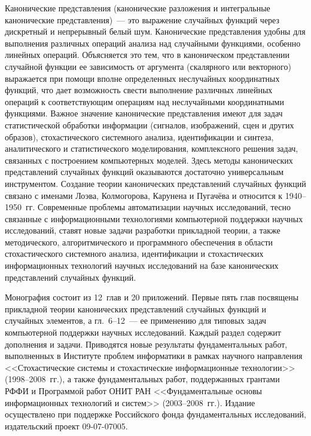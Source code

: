      \begin{multicols}{2}
     {\small
     {\baselineskip=10.1pt
     
    
      Канонические представления (канонические разложения и интегральные 
канонические представления)~--- это выражение случайных функций через дискретный и 
непрерывный белый шум. Канонические представления удобны для выполнения 
различных операций анализа над случайными функциями, особенно линейных операций. 
Объясняется это тем, что в каноническом представлении случайной функции ее 
зависимость от аргумента (скалярного или векторного) выражается при помощи вполне 
определенных неслучайных координатных функций, что дает возможность свести 
выполнение различных линейных операций к соответствующим операциям над 
неслучайными координатными функциями. Важное значение канонические 
представления имеют для задач статистической обработки информации (сигналов, 
изображений, сцен и других образов), стохастического системного анализа, идентификации и 
синтеза, аналитического и статистического моделирования, комплексного решения задач, 
связанных с построением компьютерных моделей. Здесь методы канонических 
представлений случайных функций оказываются достаточно универсальным 
инструментом. Создание теории канонических пред\-став\-ле\-ний случайных функций 
связано с именами Лоэва, Колмогорова, Карунена и Пугачёва и относится к 1940--1950~гг. 
Современные проблемы автоматизации научных исследований, тесно связанные 
с информационными технологиями компьютерной поддержки научных исследований, 
ставят новые задачи разработки прикладной теории, а также методического, 
алгоритмического и программного обеспечения в области стохастического системного 
анализа, идентификации и стохастических информационных технологий научных 
исследований на базе канонических представлений случайных функций.
      
      Монография состоит из 12~глав и 20 приложений. Первые пять глав посвящены 
прикладной теории канонических представлений случайных функций и случайных 
элементов, а гл.~6--12~--- ее применению для типовых задач компьютерной поддержки 
научных исследований. Каждый раздел содержит дополнения и задачи. Приводятся новые 
результаты фундаментальных работ, выполненных в Институте проблем информатики в 
рамках научного направления <<Стохастические системы и стохастические 
информационные технологии>> (1998--2008~гг.), а также фундаментальных работ, 
поддержанных грантами РФФИ и Программой работ ОНИТ РАН <<Фундаментальные 
основы информационных технологий и систем>> (2003--2008~гг.). Издание осуществлено 
при поддержке Российского фонда фундаментальных исследований, издательский проект 
09-07-07005.
      
}}
\end{multicols}
